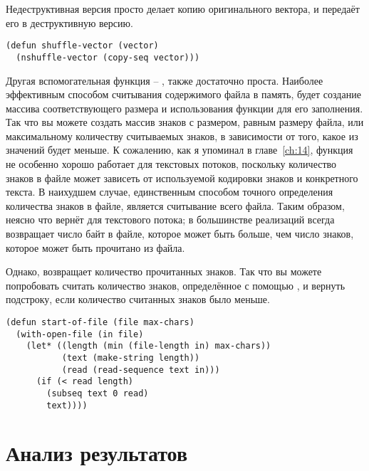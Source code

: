 Недеструктивная версия просто делает копию оригинального вектора, и передаёт его в
деструктивную версию.

\begin{lstlisting}
(defun shuffle-vector (vector)
  (nshuffle-vector (copy-seq vector)))
\end{lstlisting}

Другая вспомогательная функция -- , также достаточно проста.  Наиболее
эффективным способом считывания содержимого файла в память, будет создание массива
соответствующего размера и использования функции  для его заполнения.
Так что вы можете создать массив знаков с размером, равным размеру файла, или
максимальному количеству считываемых знаков, в зависимости от того, какое из значений
будет меньше.  К сожалению, как я упоминал в главе~\ref{ch:14}, функция 
не особенно хорошо работает для текстовых потоков, поскольку количество знаков в файле
может зависеть от используемой кодировки знаков и конкретного текста.  В наихудшем случае,
единственным способом точного определения количества знаков в файле, является считывание
всего файла.  Таким образом, неясно что вернёт  для текстового потока; в
большинстве реализаций  всегда возвращает число байт в файле, которое
может быть больше, чем число знаков, которое может быть прочитано из файла.

Однако,  возвращает количество прочитанных знаков.  Так что вы можете
попробовать считать количество знаков, определённое с помощью , и вернуть
подстроку, если количество считанных знаков было меньше.

\begin{lstlisting}
(defun start-of-file (file max-chars)
  (with-open-file (in file)
    (let* ((length (min (file-length in) max-chars))
           (text (make-string length))
           (read (read-sequence text in)))
      (if (< read length)
        (subseq text 0 read)
        text))))
\end{lstlisting}


\section{Анализ результатов}

